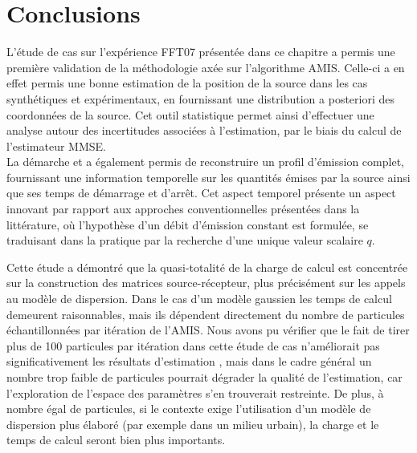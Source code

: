 \section{Conclusions}

L'étude de cas sur l'expérience FFT07 présentée dans ce chapitre a permis une première validation de la méthodologie axée sur l'algorithme AMIS. Celle-ci a en effet permis une bonne estimation de la position de la source dans les cas synthétiques et expérimentaux,  en fournissant une distribution a posteriori des coordonnées de la source. Cet outil statistique permet ainsi d'effectuer une analyse autour des incertitudes associées à l'estimation,  par le biais du calcul de l'estimateur MMSE. \\

 La démarche et a également permis de reconstruire un profil d'émission complet, fournissant une information temporelle sur les quantités émises par la source ainsi que ses temps de démarrage et d'arrêt. Cet aspect temporel présente un aspect innovant par rapport aux approches conventionnelles présentées dans la littérature, où l'hypothèse d'un débit d'émission constant est formulée, se traduisant dans la pratique par la recherche d'une unique valeur scalaire $q$. 
 
Cette étude a démontré que la quasi-totalité de la charge de calcul est concentrée sur la construction des matrices source-récepteur, plus précisément sur les appels au modèle de dispersion. Dans le cas d'un modèle gaussien les temps de calcul demeurent raisonnables, mais ils dépendent directement du nombre de particules échantillonnées par itération de l'AMIS. Nous avons pu vérifier que le fait de tirer plus de 100 particules par itération dans cette étude de cas n'améliorait pas significativement les résultats d'estimation , mais dans le cadre général un nombre trop faible de particules pourrait dégrader la qualité de l'estimation, car l'exploration de l'espace des paramètres s'en trouverait restreinte. De plus, à nombre égal de particules, si le contexte exige l'utilisation d'un modèle de dispersion plus élaboré (par exemple dans un milieu urbain), la charge et le temps de calcul seront bien plus importants. \\



